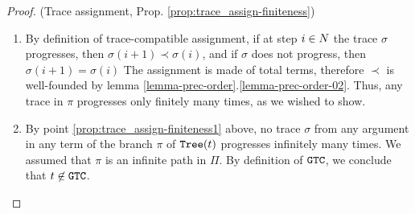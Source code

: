 \begin{proof}(Trace assignment, Prop.
\ref{prop:trace_assign-finiteness})
\begin{enumerate}
\item
By definition of trace-compatible assignment, if at step $i \in {N}$ the trace $\sigma$ progresses, 
then $\sigma(i+1)\prec \sigma(i)$, and if $\sigma$ does not progress, 
then $\sigma(i+1) = \sigma(i)$
The assignment is made of total terms, therefore
 $\prec$ is well-founded by lemma \ref{lemma-prec-order}.\ref{lemma-prec-order-02}.
Thus, any  trace in $\pi$ progresses only finitely many times, as we wished to show.

\item
By point \ref{prop:trace_assign-finiteness1} above, no trace $\sigma$ 
from any argument in any term of the branch $\pi$ of ${\tt Tree}(t)$ progresses infinitely many times.
We assumed that $\pi$ is an infinite path in $\Pi$.
By definition of ${\tt GTC}$, we conclude that $t \not \in {\tt GTC}$. 
\end{enumerate}
\end{proof}


%
%
%
%
%
%
%

